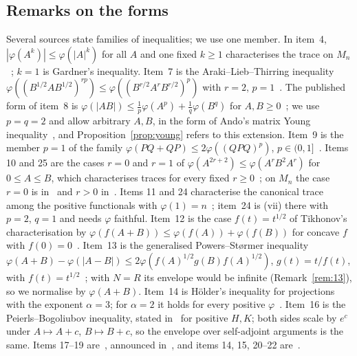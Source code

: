 \documentclass[11pt]{article}
\theoremstyle{plain}
\theoremstyle{definition}
\theoremstyle{remark}
\begin{document}
\subsection{Remarks on the forms}\label{sec:forms}
Several sources state families of inequalities; we use one member. In item~4, $|\varphi(A^k)|\le\varphi(|A|^k)$ for all
$A$ and one fixed $k\ge1$ characterises the trace on $M_n$~\cite[Theorem~1]{petz1988}; $k=1$ is Gardner's inequality.
Item~7 is the Araki--Lieb--Thirring inequality $\varphi((B^{1/2}AB^{1/2})^{rp})\le\varphi((B^{r/2}A^rB^{r/2})^p)$ with
$r=2$, $p=1$~\cite[Lemma~2]{bikchentaev2011pb}. The published form of item~8 is $\varphi(|AB|)\le\frac1p\varphi(A^p)+
\frac1q\varphi(B^q)$ for $A,B\ge0$~\cite{bikchentaev2005young}; we use $p=q=2$ and allow arbitrary $A,B$, in the form of
Ando's matrix Young inequality~\cite{ando1995}, and Proposition~\ref{prop:young} refers to this extension. Item~9 is the
member $p=1$ of the family $\varphi(PQ+QP)\le2\varphi((QPQ)^p)$, $p\in(0,1]$~\cite{bikchentaev2019abed}. Items 10 and 25
are the cases $r=0$ and $r=1$ of $\varphi(A^{2r+2})\le\varphi(A^rB^2A^r)$ for $0\le A\le B$, which characterises traces for
every fixed $r\ge0$~\cite[Lemma~1, Theorems~4,~5]{hoa2010}; on $M_n$ the case $r=0$ is
in~\cite{bikchentaev2007mono,sano2006} and $r>0$ in~\cite[Theorem~6]{hoa2007}. Items 11 and 24 characterise the
canonical trace among the positive functionals with $\varphi(1)=n$~\cite[Theorem~3]{bikchentaev2020det}; item~24 is (vii)
there with $p=2$, $q=1$ and needs $\varphi$ faithful. Item~12 is the case $f(t)=t^{1/2}$ of Tikhonov's
characterisation by $\varphi(f(A+B))\le\varphi(f(A))+\varphi(f(B))$ for concave $f$ with
$f(0)=0$~\cite[Corollary~1]{tikhonov2005}. Item~13 is the generalised Powers--St{\o}rmer inequality
$\varphi(A+B)-\varphi(|A-B|)\le2\varphi(f(A)^{1/2}g(B)f(A)^{1/2})$, $g(t)=t/f(t)$, with $f(t)=t^{1/2}$~\cite[Lemma~3.1,
Remark~4]{hoa2013}; with $N=R$ its envelope would be infinite (Remark~\ref{rem:13}), so we normalise by $\varphi(A+B)$.
Item~14 is Hölder's inequality for projections with the exponent $\alpha=3$; for $\alpha=2$ it holds for every positive
$\varphi$~\cite[remark after Theorem~2]{bikchentaev2011mn}. Item~16 is the Peierls--Bogoliubov inequality, stated
in~\cite{bikchentaev2011pb} for positive $H,K$; both sides scale by $e^c$ under $A\mapsto A+c$, $B\mapsto B+c$, so the
envelope over self-adjoint arguments is the same. Items 17--19 are~\cite[Theorem~3.4]{bikchentaev2010smj}, announced
in~\cite{bikchentaev2009rm}, and items 14, 15, 20--22 are~\cite[Theorem~2]{bikchentaev2011mn}.
\end{document}
